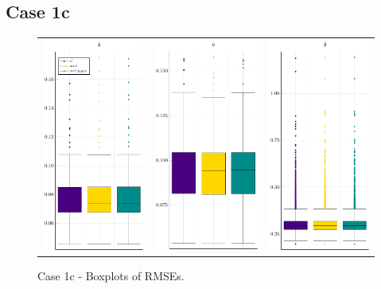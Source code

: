 \subsection{Case 1c}
\begin{figure}[H] 
	\centering
	\begin{tabular}[b]{c c c}
		\includegraphics[width=.3\textwidth]{Figures/1c/RMSE_b.pdf} & \includegraphics[width=.3\textwidth]{Figures/1c/RMSE_a.pdf} & \includegraphics[width=.3\textwidth]{Figures/1c/RMSE_t.pdf}
	\end{tabular}
	\caption{Case 1c - Boxplots of RMSEs.}
	\label{fig:bpRMSE1c}
\end{figure}
